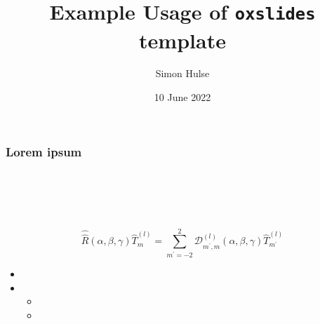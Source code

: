 \documentclass[mfbranding]{oxslides}
\title[\texttt{oxslides Example}]{Example Usage of \texttt{oxslides} template}
\author{Simon Hulse}
\date[10/6/22]{10 June 2022}
\begin{document}
\begin{frame}
  \titlepage
\end{frame}

\begin{frame}
    \frametitle{Lorem ipsum}
    \framesubtitle{\lipsum[1][2]}
  \lipsum[1][3]\\
  \textbf{\lipsum[1][4]}\\
  \textit{\lipsum[1][5]}\\
  \texttt{\lipsum[1][6]}\\
  \[ \hat{\hat{R}} (\alpha, \beta, \gamma) \hat{T}_m^{(l)} = \sum_{m^{\prime} = -2}^2 \mathcal{D}_{m^{\prime}, m}^{(l)} (\alpha, \beta, \gamma) \hat{T}_{m^{\prime}}^{(l)} \]
  \begin{itemize}
      \item \lipsum[1][7]
      \item \lipsum[1][8]
      \begin{itemize}
          \item \lipsum[1][9]
          \item \lipsum[1][10]
      \end{itemize}
  \end{itemize}
\end{frame}
\end{document}
